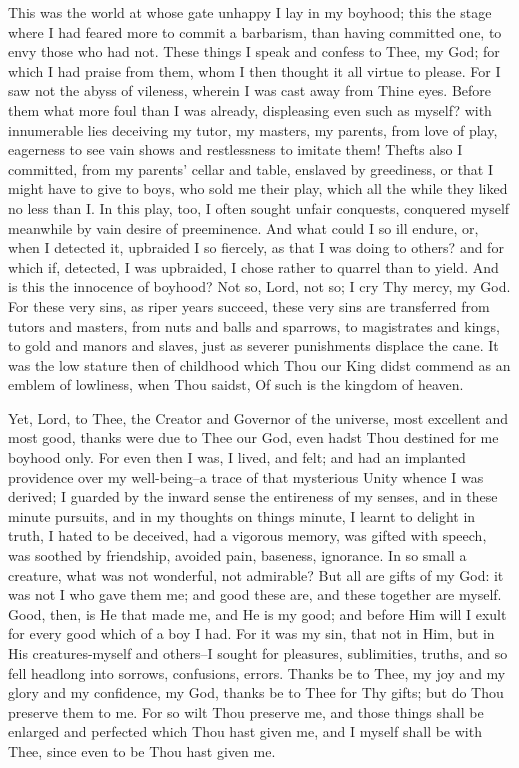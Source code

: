\documentclass[b5paper,openright,12pt,twoside]{book}
\begin{document}
This was the world at whose gate unhappy I lay in my boyhood; this
the stage where I had feared more to commit a barbarism, than having
committed one, to envy those who had not. These things I speak and
confess to Thee, my God; for which I had praise from them, whom I then
thought it all virtue to please. For I saw not the abyss of vileness,
wherein I was cast away from Thine eyes. Before them what more foul than
I was already, displeasing even such as myself? with innumerable lies
deceiving my tutor, my masters, my parents, from love of play, eagerness
to see vain shows and restlessness to imitate them! Thefts also I
committed, from my parents' cellar and table, enslaved by greediness, or
that I might have to give to boys, who sold me their play, which all
the while they liked no less than I. In this play, too, I often
sought unfair conquests, conquered myself meanwhile by vain desire of
preeminence. And what could I so ill endure, or, when I detected it,
upbraided I so fiercely, as that I was doing to others? and for which
if, detected, I was upbraided, I chose rather to quarrel than to yield.
And is this the innocence of boyhood? Not so, Lord, not so; I cry Thy
mercy, my God. For these very sins, as riper years succeed, these very
sins are transferred from tutors and masters, from nuts and balls and
sparrows, to magistrates and kings, to gold and manors and slaves, just
as severer punishments displace the cane. It was the low stature then of
childhood which Thou our King didst commend as an emblem of lowliness,
when Thou saidst, Of such is the kingdom of heaven.

Yet, Lord, to Thee, the Creator and Governor of the universe, most
excellent and most good, thanks were due to Thee our God, even hadst
Thou destined for me boyhood only. For even then I was, I lived, and
felt; and had an implanted providence over my well-being--a trace of
that mysterious Unity whence I was derived; I guarded by the inward
sense the entireness of my senses, and in these minute pursuits, and in
my thoughts on things minute, I learnt to delight in truth, I hated to
be deceived, had a vigorous memory, was gifted with speech, was
soothed by friendship, avoided pain, baseness, ignorance. In so small a
creature, what was not wonderful, not admirable? But all are gifts of
my God: it was not I who gave them me; and good these are, and these
together are myself. Good, then, is He that made me, and He is my good;
and before Him will I exult for every good which of a boy I had. For it
was my sin, that not in Him, but in His creatures-myself and others--I
sought for pleasures, sublimities, truths, and so fell headlong into
sorrows, confusions, errors. Thanks be to Thee, my joy and my glory
and my confidence, my God, thanks be to Thee for Thy gifts; but do Thou
preserve them to me. For so wilt Thou preserve me, and those things
shall be enlarged and perfected which Thou hast given me, and I myself
shall be with Thee, since even to be Thou hast given me.
\end{document}
